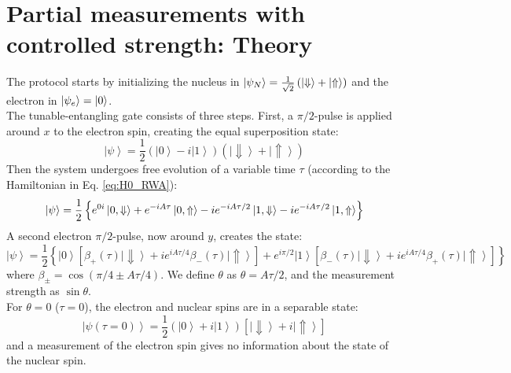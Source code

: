 \section{Partial measurements with controlled strength: Theory}
\label{sec:theory}
The protocol starts by initializing the nucleus in $\left|\psi_N\right> = \frac{1}{\sqrt{2}} \left( \left|\Downarrow\right>+\left|\Uparrow\right> \right)$ and the electron in $\left|\psi_e\right> = \left|0\right>$.\\
The tunable-entangling gate consists of three steps. First, a $\pi/2$-pulse is applied around $x$ to the electron spin, creating the equal superposition state:
\begin{equation}
\left| \psi \right \rangle = \frac{1}{2} \left( \left| 0 \right \rangle - i \left| 1 \right \rangle \right) \left( \left| \Downarrow \right \rangle +\left| \Uparrow \right \rangle\right)
\end{equation}
Then the system undergoes free evolution of a variable time $\tau$ (according to the Hamiltonian in Eq. \ref{eq:H0_RWA}):
\begin{equation}
\left| \psi\right> = \frac{1}{2} \left \lbrace e^{0i} \left| 0, \Downarrow \right> + e^{-i A \tau} \left| 0, \Uparrow \right> - i  e^{-i A \tau/2} \left| 1, \Downarrow \right> - i  e^{-i A \tau/2} \left| 1, \Uparrow\right> \right \rbrace
\end{equation}
A second electron $\pi/2$-pulse, now around $y$, creates the state:
\begin{equation}
\left| \psi \right \rangle = \frac{1}{2} \left\lbrace \left| 0 \right \rangle \left[ \beta_+ (\tau) \left| \Downarrow \right \rangle + i e^{i A\tau/4} \beta_-(\tau) \left| \Uparrow \right \rangle \right] + e^{i\pi /2} \left| 1 \right \rangle \left[ \beta_-(\tau) \left| \Downarrow \right \rangle + i e^{i A\tau/4} \beta_+(\tau) \left| \Uparrow \right \rangle \right] \right\rbrace
\label{eq:state}
\end{equation}
where $\beta_{\pm} = \cos(\pi/4 \pm  A \tau/4)$. We define $\theta$ as $\theta= A \tau/2$, and the measurement strength as $\sin\theta$.\\
For $\theta=0$ ($\tau = 0$), the electron and nuclear spins are in a separable state:
\begin{equation}
\left| \psi (\tau=0) \right \rangle = \frac{1}{2} \left( \left| 0 \right \rangle +i \left| 1 \right \rangle \right) \left[ \left| \Downarrow \right \rangle +  i \left| \Uparrow \right \rangle \right]
\end{equation}
and a measurement of the electron spin gives no information about the state of the nuclear spin.
